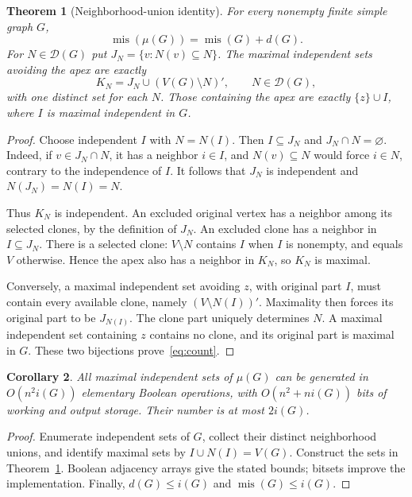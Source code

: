 \documentclass[11pt,letterpaper]{article}
\newtheorem{theorem}{Theorem}[section]
\newtheorem{corollary}[theorem]{Corollary}
\theoremstyle{remark}
\newcommand{\mi}{\operatorname{mis}}
\begin{document}
\begin{theorem}[Neighborhood-union identity]\label{thm:compression}
For every nonempty finite simple graph $G$,
\begin{equation}\label{eq:count}
 \mi(\mu(G))=\mi(G)+d(G).
\end{equation}
For $N\in\mathcal D(G)$ put $J_N=\{v:N(v)\subseteq N\}$. The maximal
independent sets avoiding the apex are exactly
\[
 K_N=J_N\cup(V(G)\setminus N)',\qquad N\in\mathcal D(G),
\]
with one distinct set for each $N$. Those containing the apex are exactly
$\{z\}\cup I$, where $I$ is maximal independent in $G$.
\end{theorem}
\begin{proof}
Choose independent $I$ with $N=N(I)$. Then $I\subseteq J_N$ and
$J_N\cap N=\varnothing$. Indeed, if $v\in J_N\cap N$, it has a neighbor
$i\in I$, and $N(v)\subseteq N$ would force $i\in N$, contrary to the
independence of $I$. It follows that $J_N$ is independent and
$N(J_N)=N(I)=N$.

Thus $K_N$ is independent. An excluded original vertex has a neighbor
among its selected clones, by the definition of $J_N$. An excluded clone
has a neighbor in $I\subseteq J_N$. There is a selected clone: $V\setminus N$
contains $I$ when $I$ is nonempty, and equals $V$ otherwise. Hence the apex
also has a neighbor in $K_N$, so $K_N$ is maximal.

Conversely, a maximal independent set avoiding $z$, with original part
$I$, must contain every available clone, namely $(V\setminus N(I))'$.
Maximality then forces its original part to be $J_{N(I)}$. The clone part
uniquely determines $N$. A maximal independent set containing $z$ contains
no clone, and its original part is maximal in $G$. These two bijections
prove~\eqref{eq:count}.
\end{proof}

\begin{corollary}\label{cor:complexity}
All maximal independent sets of $\mu(G)$ can be generated in
$O(n^2i(G))$ elementary Boolean operations, with
$O(n^2+ni(G))$ bits of working and output storage. Their number is at most
$2i(G)$.
\end{corollary}
\begin{proof}
Enumerate independent sets of $G$, collect their distinct neighborhood
unions, and identify maximal sets by $I\cup N(I)=V(G)$. Construct the sets
in Theorem~\ref{thm:compression}. Boolean adjacency arrays give the stated
bounds; bitsets improve the implementation. Finally,
$d(G)\le i(G)$ and $\mi(G)\le i(G)$.
\end{proof}
\end{document}
